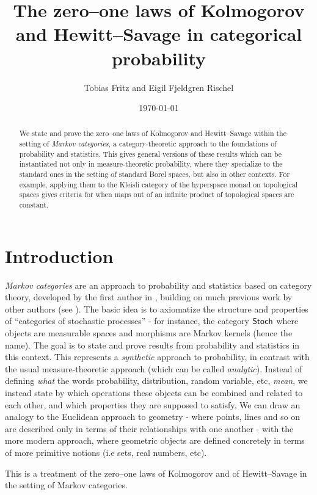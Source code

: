\documentclass[11pt]{article}
\author{Tobias Fritz and Eigil Fjeldgren Rischel}
\title{The zero--one laws of Kolmogorov and Hewitt--Savage in categorical probability}
\date{\today}
\begin{document}
\maketitle

\begin{abstract}
	We state and prove the zero--one laws of Kolmogorov and Hewitt--Savage within the setting of \emph{Markov categories}, a category-theoretic approach to the foundations of probability and statistics. This gives general versions of these results which can be instantiated not only in measure-theoretic probability, where they specialize to the standard ones in the setting of standard Borel spaces, but also in other contexts. For example, applying them to the Kleisli category of the hyperspace monad on topological spaces gives criteria for when maps out of an infinite product of topological spaces are constant.
\end{abstract}

\tableofcontents

\section{Introduction}

\emph{Markov categories} are an approach to probability and statistics based on category theory, developed by the first author in \cite{markov_cats}, building on much previous work by other authors (see ).
The basic idea is to axiomatize the structure and properties of ``categories of stochastic processes'' - for instance, the category $\operatorname{\mathsf{Stoch}}$ where objects are measurable spaces and morphisms are Markov kernels (hence the name).
The goal is to state and prove results from probability and statistics in this context.
This represents a \emph{synthetic} approach to probability, in contrast with the usual measure-theoretic approach (which can be called \emph{analytic}).
Instead of defining \emph{what} the words probability, distribution, random variable, etc, \emph{mean}, we instead state by which operations these objects can be combined and related to each other, and which properties they are supposed to satisfy.
We can draw an analogy to the Euclidean approach to geometry - where points, lines and so on are described only in terms of their relationships with one another - with the more modern approach, where geometric objects are defined concretely in terms of more primitive notions (i.e sets, real numbers, etc).

This is a treatment of the zero--one laws of Kolmogorov and of Hewitt--Savage in the setting of Markov categories.
\end{document}

